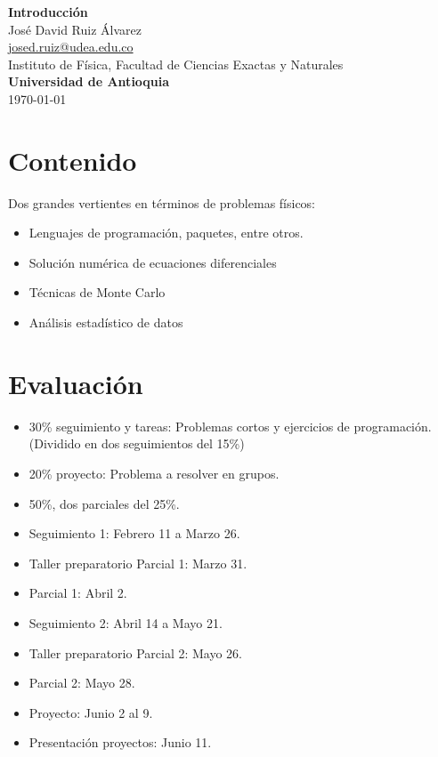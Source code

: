 \documentclass[10.5pt]{article}
\begin{document}
\noindent
\begin{minipage}[b]{0.75\linewidth}
{\LARGE\bf Introducción}\\ %
\large{Jos\'{e} David Ruiz \'{A}lvarez} \\
\small{\href{mailto:josed.ruiz@udea.edu.co}{josed.ruiz@udea.edu.co}} \\ %
\normalsize{Instituto de Física, Facultad de Ciencias Exactas y Naturales} \\%
\normalsize{\bf Universidad de Antioquia} \\[8mm]
\today %
\end{minipage}%

\section{Contenido}

Dos grandes vertientes en t\'{e}rminos de problemas f\'{i}sicos: 
\begin{itemize}
\item Lenguajes de programación, paquetes, entre otros.
\item Solución numérica de ecuaciones diferenciales
\item Técnicas de Monte Carlo
\item Análisis estadístico de datos
\end{itemize}

\section{Evaluación}

\begin{itemize}
\item 30\% seguimiento y tareas: Problemas cortos y ejercicios de programación. (Dividido en dos seguimientos del 15\%)
\item 20\% proyecto: Problema a resolver en grupos.
\item 50\%, dos parciales del 25\%. 
\end{itemize}

\begin{itemize}
\item Seguimiento 1: Febrero 11 a Marzo 26.
\item Taller preparatorio Parcial 1: Marzo 31.
\item Parcial 1: Abril 2.
\item Seguimiento 2: Abril 14 a Mayo 21.
\item Taller preparatorio Parcial 2: Mayo 26.
\item Parcial 2: Mayo 28.
\item Proyecto: Junio 2 al 9.
\item Presentación proyectos: Junio 11.
\end{itemize}
\end{document}
